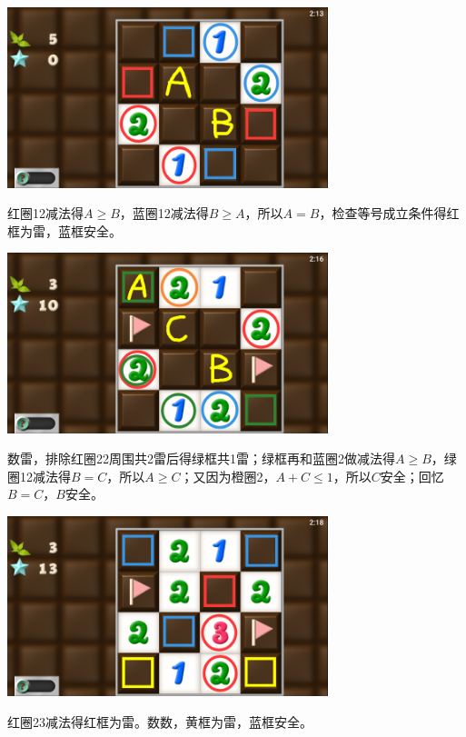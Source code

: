 \subsection{} %
\begin{center}
    \includegraphics[width=0.7\textwidth]{puzzle/143-1.png}
\end{center}
红圈12减法得$A\ge B$，蓝圈12减法得$B\ge A$，所以$A=B$，检查等号成立条件得红框为雷，蓝框安全。
\begin{center}
    \includegraphics[width=0.7\textwidth]{puzzle/143-2.png}
\end{center}
数雷，排除红圈22周围共2雷后得绿框共1雷；绿框再和蓝圈2做减法得$A\ge B$，绿圈12减法得$B=C$，所以$A\ge C$；又因为橙圈2，$A+C\le 1$，所以$C$安全；回忆$B=C$，$B$安全。
\begin{center}
    \includegraphics[width=0.7\textwidth]{puzzle/143-3.png}
\end{center}
红圈23减法得红框为雷。数数，黄框为雷，蓝框安全。

